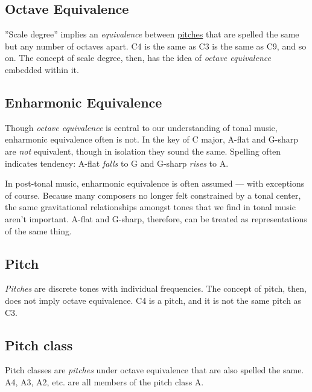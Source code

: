 \documentclass{book}
\begin{document}
\hypertarget{octave-equivalence}{%
\subsection{Octave Equivalence}\label{octave-equivalence}}

''Scale degree'' implies an \emph{equivalence} between
\href{pitches.html}{pitches} that are spelled the same but any number of
octaves apart. C4 is the same as C3 is the same as C9, and so on. The concept
of scale degree, then, has the idea of \emph{octave equivalence} embedded
within it.

\hypertarget{enharmonic-equivalence-1}{%
\subsection{Enharmonic Equivalence}\label{enharmonic-equivalence-1}}

Though \emph{octave equivalence} is central to our understanding of tonal
music, enharmonic equivalence often is not. In the key of C major, A-flat and
G-sharp are \emph{not} equivalent, though in isolation they sound the same.
Spelling often indicates tendency: A-flat \emph{falls} to G and G-sharp
\emph{rises} to A.

In post-tonal music, enharmonic equivalence is often assumed --- with
exceptions of course. Because many composers no longer felt constrained by a
tonal center, the same gravitational relationships amongst tones that we find
in tonal music aren't important. A-flat and G-sharp, therefore, can be treated
as representations of the same thing.

\hypertarget{pitch}{%
\subsection{Pitch}\label{pitch}}

\emph{Pitches} are discrete tones with individual frequencies. The concept of
pitch, then, does not imply octave equivalence. C4 is a pitch, and it is not
the same pitch as C3.

\hypertarget{pitch-class}{%
\subsection{Pitch class}\label{pitch-class}}

Pitch classes are \emph{pitches} under octave equivalence that are also
spelled the same. A4, A3, A2, etc. are all members of the pitch class A.
\end{document}
